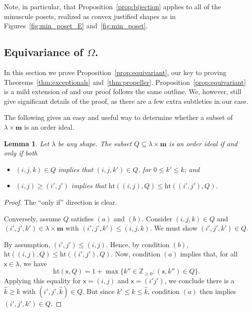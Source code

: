 \documentclass[12pt]{amsart}
\newcommand{\x}{\ensuremath{\mathsf{x}}}
\newtheorem{lemma}[theorem]{Lemma}
\theoremstyle{definition}
\theoremstyle{remark}
\numberwithin{equation}{section}
\begin{document}
Note, in particular, that Proposition~\ref{prop:bijection} applies to all of the minuscule posets, realized as convex justified shapes as in Figures~\ref{fig:min_poset_E} and~\ref{fig:min_poset}.

\subsection{Equivariance of $\Omega$.} 
In this section we prove Proposition~\ref{prop:equivariant}, our key to proving Theorems~\ref{thm:exceptionals} and~\ref{thm:propeller}. Proposition~\ref{prop:equivariant} is a mild extension of \cite[Lemma~4.2]{DPS} and our proof follows the same outline. We, however, still give significant details of the proof, as there are a few extra subtleties in our case.

The following gives an easy and useful way to determine whether a subset of $\lambda \times \mathbf{m}$ is an order ideal. 
\begin{lemma}\label{lem:whos_an_ideal?}
Let $\lambda$ be any shape. The subset $Q \subseteq \lambda \times \mathbf{m}$ is an order ideal if and only if both
\begin{itemize}
\item[(a)] $(i,j,k) \in Q$ implies that $(i,j,k') \in Q$, for $0 \leq k' \leq k$; and
\item[(b)] $(i,j) \geq (i',j')$ implies that $\mathrm{ht}((i,j),Q) \leq \mathrm{ht}((i',j'),Q)$.
\end{itemize}
\end{lemma}
\begin{proof} 
The ``only if'' direction is clear. 

Conversely, assume $Q$ satisfies $(a)$ and $(b)$. Consider $(i,j,k) \in Q$ and $(i',j',k') \in \lambda \times \mathbf{m}$ with $(i',j',k') \leq (i,j,k)$. We must show $(i',j',k') \in Q$. 

By assumption, $(i',j') \leq (i,j)$. Hence, by condition $(b)$, $\mathrm{ht}((i,j),Q) \leq \mathrm{ht}((i',j'),Q)$. Now, condition $(a)$ implies that, for all $\x \in \lambda$, we have \[ \mathrm{ht}(\x,Q) = 1 + \max \{ k'' \in \mathbb{Z}_{\geq 0} : (\x,k'') \in Q \}. \]  Applying this equality for $\x = (i,j)$ and $\x = (i'j')$, we conclude there is a $\hat{k} \geq k$ with $(i',j',\hat{k}) \in Q$. But since $k' \leq k \leq \hat{k}$, condition $(a)$ then implies $(i',j',k') \in Q$. 
\end{proof}
\end{document}

